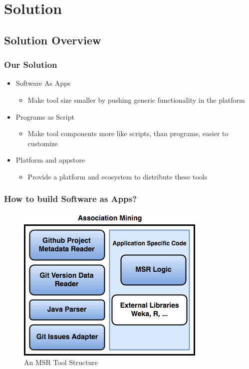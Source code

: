 \section{Solution}
    \subsection{Solution Overview}
        \begin{frame}
        \frametitle{Our Solution}
        \begin{itemize}
          \item Software As Apps
            \begin{itemize}
                \item Make tool size smaller by pushing generic functionality in the platform
            \end{itemize}
          \item Programs as Script
            \begin{itemize}
                \item Make tool components more like scripts, than programs, easier to customize
            \end{itemize}
          \item Platform and appstore
            \begin{itemize}
                \item Provide a platform and ecosystem to distribute these tools
            \end{itemize}

        \end{itemize}
        \end{frame}

        \begin{frame}
            \frametitle{How to build Software as Apps?}
            \begin{figure}
                \centering
                \includegraphics[scale=0.30]{figures/association.jpg}
                \caption{An MSR Tool Structure}
            \end{figure}
        \end{frame}

